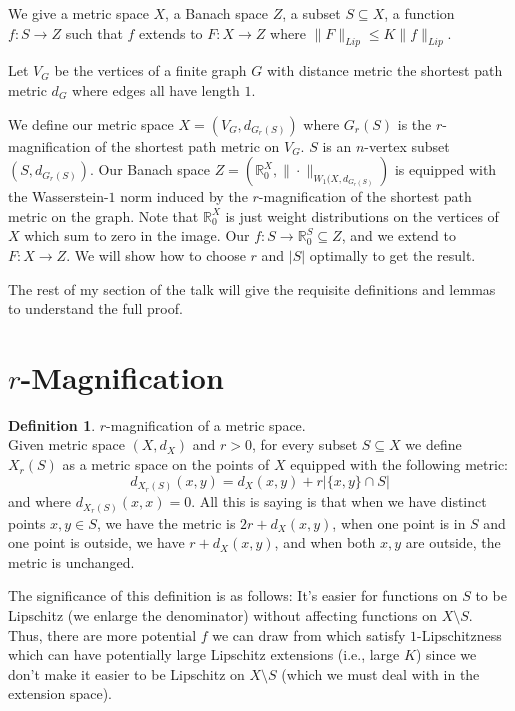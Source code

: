 \documentclass[10pt]{article}
\theoremstyle{definition}
\newtheorem{definition}[theorem]{Definition}
\theoremstyle{definition}
\theoremstyle{definition}
\theoremstyle{definition}
\newcommand{\R}
{\mathbb{R}}
\begin{document}
We give a metric space $X$, a Banach space $Z$, a subset $S \subseteq X$, a function $f:S \to Z$ such that $f$ extends to $F: X \to Z$ where $\|F\|_{Lip} \leq K\|f\|_{Lip}$. 

Let $V_G$ be the vertices of a finite graph $G$ with distance metric the shortest path metric $d_G$ where edges all have length $1$. 

We define our metric space $X = (V_G, d_{G_r(S)})$ where $G_r(S)$ is the $r$-magnification of the shortest path metric on $V_G$. $S$ is an $n$-vertex subset $(S, d_{G_r(S)})$. 
Our Banach space $Z = (\R_0^{X}, \|\cdot\|_{W_1(X, d_{G_r(S)}})$ is equipped with the Wasserstein-$1$ norm induced by the $r$-magnification of the shortest path metric on the graph. Note that $\R_0^{X}$ is just weight distributions on the vertices of $X$ which sum to zero in the image. Our $f: S \to \R_0^{S} \subseteq Z$, and we extend to $F: X \to Z$. We will show how to choose $r$ and $|S|$ optimally to get the result. 

The rest of my section of the talk will give the requisite definitions and lemmas to understand the full proof. 

\section{$r$-Magnification}

\begin{definition} $r$-magnification of a metric space. \\
Given metric space $(X, d_X)$ and $r > 0$, for every subset $S \subseteq X$ we define
$X_r(S)$ as a metric space on the points of $X$ equipped with the following metric:
\[
d_{X_r(S)}(x, y) = d_X(x, y) + r|\{x, y\} \cap S|
\]
and where $d_{X_r(S)}(x, x) = 0$. 
All this is saying is that when we have distinct points $x, y \in S$, we have the metric is
$2r + d_X(x, y)$, when one point is in $S$ and one point is outside, we have $r + d_X(x, y)$, and
when both $x, y$ are outside, the metric is unchanged.
\end{definition}

The significance of this definition is as follows: It's easier for functions on $S$ to be Lipschitz (we enlarge the denominator) without affecting functions on $X \setminus S$. Thus, there are more potential $f$ we can draw from which satisfy $1$-Lipschitzness which can have potentially large Lipschitz extensions (i.e., large $K$) since we don't make it easier to be Lipschitz on $X \setminus S$ (which we must deal with in the extension space).
\end{document}
